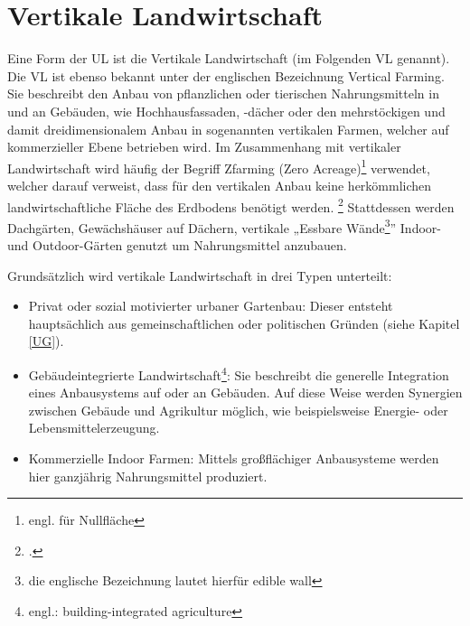 \documentclass{scrartcl}
\begin{document}
\section{Vertikale Landwirtschaft}

Eine Form der UL ist die Vertikale Landwirtschaft (im Folgenden VL genannt). Die VL ist ebenso bekannt unter der englischen Bezeichnung Vertical Farming. Sie beschreibt den Anbau von pflanzlichen oder tierischen Nahrungsmitteln in und an Gebäuden, wie Hochhausfassaden, -dächer oder den mehrstöckigen und damit dreidimensionalem Anbau in sogenannten vertikalen Farmen, welcher auf kommerzieller Ebene betrieben wird. Im Zusammenhang mit vertikaler Landwirtschaft wird häufig der Begriff Zfarming (Zero Acreage)\footnote{engl. für Nullfläche} verwendet, welcher darauf verweist, dass für den vertikalen Anbau keine herkömmlichen landwirtschaftliche Fläche des Erdbodens benötigt werden. \footcite{StadtischeFarming} Stattdessen werden Dachgärten, Gewächshäuser auf Dächern, vertikale „Essbare Wände\footnote{die englische Bezeichnung lautet hierfür edible wall}” Indoor- und Outdoor-Gärten genutzt um Nahrungsmittel anzubauen.

Grundsätzlich wird vertikale Landwirtschaft in drei Typen unterteilt:

\begin{itemize}
    \item Privat oder sozial motivierter urbaner Gartenbau: Dieser entsteht hauptsächlich aus gemeinschaftlichen oder politischen Gründen (siehe Kapitel \ref{UG}).
    \item Gebäudeintegrierte Landwirtschaft\footnote{engl.: building-integrated agriculture}: Sie beschreibt die generelle Integration eines Anbausystems auf oder an Gebäuden. Auf diese Weise werden Synergien zwischen Gebäude und Agrikultur möglich, wie beispielsweise Energie- oder Lebensmittelerzeugung.
    \item Kommerzielle Indoor Farmen: Mittels großflächiger Anbausysteme werden hier ganzjährig Nahrungsmittel produziert.
\end{itemize}
    
\end{document}
